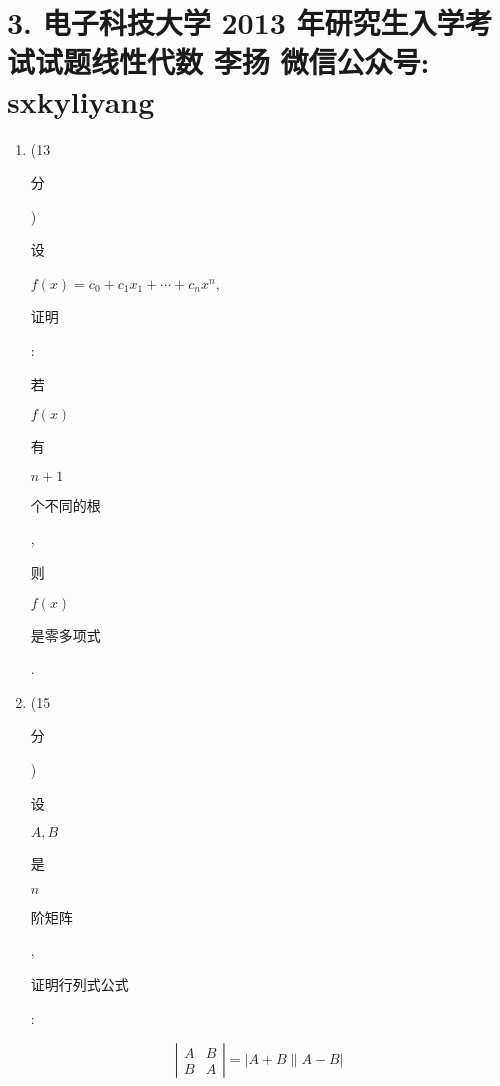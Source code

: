 \documentclass[10pt]{article}
\begin{document}
\section{3. 电子科技大学 2013 年研究生入学考试试题线性代数 
 李扬 
 微信公众号: sxkyliyang}
\begin{enumerate}
  \item (13 \begin{CJK}{UTF8}{mj}分\end{CJK}) \begin{CJK}{UTF8}{mj}设\end{CJK} $f(x)=c_{0}+c_{1} x_{1}+\cdots+c_{n} x^{n}$, \begin{CJK}{UTF8}{mj}证明\end{CJK}: \begin{CJK}{UTF8}{mj}若\end{CJK} $f(x)$ \begin{CJK}{UTF8}{mj}有\end{CJK} $n+1$ \begin{CJK}{UTF8}{mj}个不同的根\end{CJK}, \begin{CJK}{UTF8}{mj}则\end{CJK} $f(x)$ \begin{CJK}{UTF8}{mj}是零多项式\end{CJK}.

  \item (15 \begin{CJK}{UTF8}{mj}分\end{CJK}) \begin{CJK}{UTF8}{mj}设\end{CJK} $A, B$ \begin{CJK}{UTF8}{mj}是\end{CJK} $n$ \begin{CJK}{UTF8}{mj}阶矩阵\end{CJK}, \begin{CJK}{UTF8}{mj}证明行列式公式\end{CJK}:

\end{enumerate}
$$
\left|\begin{array}{ll}
A & B \\
B & A
\end{array}\right|=|A+B \| A-B|
$$
\end{document}
